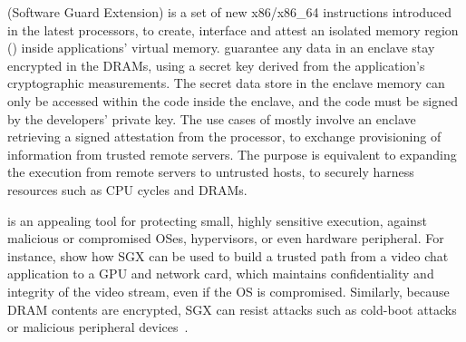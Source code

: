


\intel{} \sgx{} (Software Guard Extension)
is a set of new x86/x86\_64 instructions
introduced in the latest \intel{} \skylake{} processors,
to create, interface and attest
an isolated memory region () inside applications' virtual memory.
\sgx{} guarantee any data in an enclave
stay encrypted in the DRAMs, using a secret key derived from
the application's cryptographic measurements.
The secret data store in the enclave memory
can only be accessed within the code inside the enclave,
and the code must be signed by the developers' private key.
The use cases of \sgx{} mostly involve an enclave
retrieving a signed attestation from the \intel{} processor,
to exchange provisioning of information from trusted remote servers.
The purpose is equivalent to
expanding the execution from remote servers
to untrusted hosts,
to securely harness resources such as CPU cycles and DRAMs.

\sgx{} is an appealing tool for protecting small, highly sensitive execution, 
against malicious or compromised OSes, hypervisors, or even hardware peripheral.
For instance, \cite{hoekstra13sgx} show how SGX can be used
to build a trusted path from a video chat application to a GPU and network card, which maintains confidentiality and integrity of the
video stream, even if the OS is compromised.
Similarly, because DRAM contents are encrypted, SGX can resist attacks such as cold-boot attacks~\citep{halderman09coldboot} or 
malicious peripheral devices~\citep{hudson15thunderstrike}.

